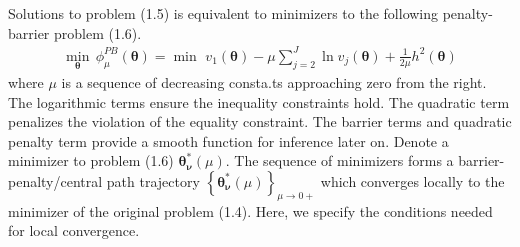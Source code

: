 \documentclass[12pt]{article}
\newcommand{\bs}{ \boldsymbol}
\newcommand{\lt}{\left}
\newcommand{\rt}{\right}
\begin{document}
Solutions to problem (1.5) is equivalent to minimizers to the following penalty-barrier problem (1.6).
\begin{equation}
\begin{gathered}
\min_{\bs{\theta}} \, \phi^{PB}_{\mu}\lt(\bs{\theta}\rt) = \min \,\,v_1(\bs{\theta}) - \mu \sum_{j=2}^J \ln v_j\lt( \bs{\theta}\rt) + \frac{1}{2\mu} h^2(\bs{\theta})
\end{gathered}
\end{equation}
where $\mu$ is a sequence of decreasing consta.ts approaching zero from the right. The logarithmic terms ensure the inequality constraints hold. The quadratic term penalizes the violation of the equality constraint. The barrier terms and quadratic penalty term provide a smooth function for inference later on. Denote a minimizer to problem (1.6) $\bs{\theta}^{*}_{\bs{\nu}}(\mu)$. The sequence of minimizers forms a barrier-penalty/central path trajectory $\lt\{ \bs{\theta}_{\bs{\nu}}^*(\mu)\rt\}_{\mu \to 0+}$ which converges locally to the minimizer of the original problem (1.4). Here, we specify the conditions needed for local convergence. 
\end{document}
